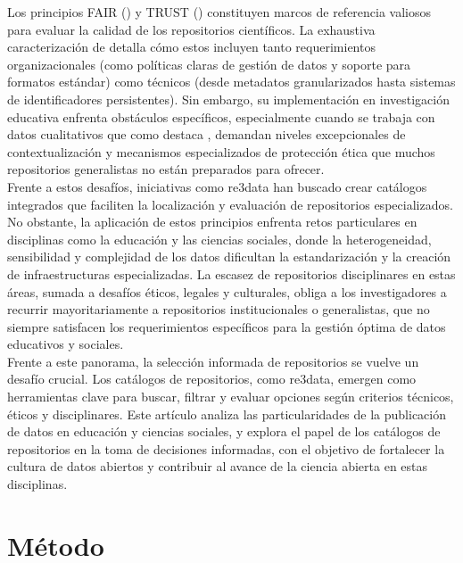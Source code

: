 \documentclass{article}
\begin{document}
Los principios FAIR (\cite{wilkinson2016}) y TRUST (\cite{Lin2020TRUST}) constituyen marcos de referencia valiosos para evaluar la calidad de los repositorios científicos. La exhaustiva caracterización de \cite{Behnke2020FAIRfeatures} detalla cómo estos incluyen tanto requerimientos organizacionales (como políticas claras de gestión de datos y soporte para formatos estándar) como técnicos (desde metadatos granularizados hasta sistemas de identificadores persistentes). Sin embargo, su implementación en investigación educativa enfrenta obstáculos específicos, especialmente cuando se trabaja con datos cualitativos que como  destaca \cite{antonio}, demandan niveles excepcionales de contextualización y mecanismos especializados de protección ética que muchos repositorios generalistas no están preparados para ofrecer.\\

Frente a estos desafíos, iniciativas como re3data \cite{pampel2013} han buscado crear catálogos integrados que faciliten la localización y evaluación de repositorios especializados.\\

No obstante, la aplicación de estos principios enfrenta retos particulares en disciplinas como la educación y las ciencias sociales, donde la heterogeneidad, sensibilidad y complejidad de los datos dificultan la estandarización y la creación de infraestructuras especializadas. La escasez de repositorios disciplinares en estas áreas, sumada a desafíos éticos, legales y culturales, obliga a los investigadores a recurrir mayoritariamente a repositorios institucionales o generalistas, que no siempre satisfacen los requerimientos específicos para la gestión óptima de datos educativos y sociales.\\

Frente a este panorama, la selección informada de repositorios se vuelve un desafío crucial. Los catálogos de repositorios, como re3data, emergen como herramientas clave para buscar, filtrar y evaluar opciones según criterios técnicos, éticos y disciplinares. Este artículo analiza las particularidades de la publicación de datos en educación y ciencias sociales, y explora el papel de los catálogos de repositorios en la toma de decisiones informadas, con el objetivo de fortalecer la cultura de datos abiertos y contribuir al avance de la ciencia abierta en estas disciplinas.\\

\section{Método}
\end{document}
